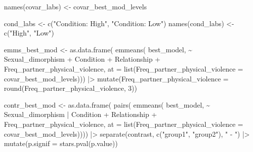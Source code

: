 \documentclass[
  bookmarksnumbered]{article}
\newenvironment{Shaded}{\begin{snugshade}}{\end{snugshade}}
\newcommand{\AttributeTok}[1]{\textcolor[rgb]{0.80,0.80,0.80}{#1}}
\newcommand{\DecValTok}[1]{\textcolor[rgb]{0.86,0.86,0.80}{#1}}
\newcommand{\FunctionTok}[1]{\textcolor[rgb]{0.94,0.94,0.56}{#1}}
\newcommand{\NormalTok}[1]{\textcolor[rgb]{0.80,0.80,0.80}{#1}}
\newcommand{\OtherTok}[1]{\textcolor[rgb]{0.94,0.94,0.56}{#1}}
\newcommand{\SpecialCharTok}[1]{\textcolor[rgb]{0.86,0.64,0.64}{#1}}
\newcommand{\StringTok}[1]{\textcolor[rgb]{0.80,0.58,0.58}{#1}}
\begin{document}
\begin{Shaded}
\begin{Highlighting}[]
  \FunctionTok{names}\NormalTok{(covar\_labs) }\OtherTok{\textless{}{-}}\NormalTok{ covar\_best\_mod\_levels}
  
\NormalTok{  cond\_labs }\OtherTok{\textless{}{-}} \FunctionTok{c}\NormalTok{(}\StringTok{"Condition: High"}\NormalTok{, }\StringTok{"Condition: Low"}\NormalTok{)}
  \FunctionTok{names}\NormalTok{(cond\_labs) }\OtherTok{\textless{}{-}} \FunctionTok{c}\NormalTok{(}\StringTok{"High"}\NormalTok{, }\StringTok{"Low"}\NormalTok{)}
  
\NormalTok{  emms\_best\_mod }\OtherTok{\textless{}{-}} \FunctionTok{as.data.frame}\NormalTok{(}
    \FunctionTok{emmeans}\NormalTok{(}
\NormalTok{      best\_model,}
      \SpecialCharTok{\textasciitilde{}}\NormalTok{ Sexual\_dimorphism }\SpecialCharTok{+}\NormalTok{ Condition }\SpecialCharTok{+}\NormalTok{ Relationship }\SpecialCharTok{+}\NormalTok{ Freq\_partner\_physical\_violence,}
      \AttributeTok{at =} \FunctionTok{list}\NormalTok{(}\AttributeTok{Freq\_partner\_physical\_violence =}\NormalTok{ covar\_best\_mod\_levels))) }\SpecialCharTok{|\textgreater{}} 
    \FunctionTok{mutate}\NormalTok{(}\AttributeTok{Freq\_partner\_physical\_violence =} \FunctionTok{round}\NormalTok{(Freq\_partner\_physical\_violence, }\DecValTok{3}\NormalTok{))}
  
\NormalTok{  contr\_best\_mod }\OtherTok{\textless{}{-}} \FunctionTok{as.data.frame}\NormalTok{(}
    \FunctionTok{pairs}\NormalTok{(}
      \FunctionTok{emmeans}\NormalTok{(}
\NormalTok{        best\_model,}
        \SpecialCharTok{\textasciitilde{}}\NormalTok{ Sexual\_dimorphism }\SpecialCharTok{|}\NormalTok{ Condition }\SpecialCharTok{+}\NormalTok{ Relationship }\SpecialCharTok{+}\NormalTok{ Freq\_partner\_physical\_violence,}
        \AttributeTok{at =} \FunctionTok{list}\NormalTok{(}\AttributeTok{Freq\_partner\_physical\_violence =}\NormalTok{ covar\_best\_mod\_levels)))) }\SpecialCharTok{|\textgreater{}}
    \FunctionTok{separate}\NormalTok{(contrast, }\FunctionTok{c}\NormalTok{(}\StringTok{"group1"}\NormalTok{, }\StringTok{"group2"}\NormalTok{), }\StringTok{" {-} "}\NormalTok{) }\SpecialCharTok{|\textgreater{}} 
    \FunctionTok{mutate}\NormalTok{(}\AttributeTok{p.signif =} \FunctionTok{stars.pval}\NormalTok{(p.value))}
  

\end{Highlighting}
\end{Shaded}
\end{document}
